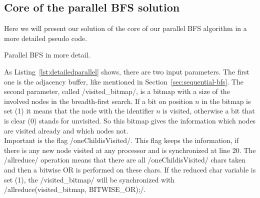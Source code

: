 \documentclass[12pt,a4paper]{article}
\begin{document}
\subsection{Core of the parallel BFS solution}
\label{sec:core}
Here we will present our solution of the core of our parallel BFS algorithm in a more detailed pseudo code.\\
\begin{listing}[h]
\begin{ccode}
/*
input: every proc has adjacency buffer of owned nodes, visited_bitmap where root is set to one
output: parent array
*/
void* BFS(adj_buffer, visited_bitmap){
	char oneChildisVisited = 1;
	while (oneChildisVisited){
	oneChildisVisited = 0;
	for (i = 0; i < size(nodes_owned); i++){
		if (nodes_owned[i] is visited for the first time) {
			for (j = 0; j < size(neighbours); j++){
				if (neighbours[j] is not visited) {
					oneChildisVisited = 1;
					set_visited_bitmap(visited_bitmap, neighbours[j]); // sets the visited bitmap on position of neighbour[j] to 1
					save_parent(parent_array, nodes_owned[i]+1,neighbours[j]); // saves that nodes_owned[i]+1 is parent of neighbours[j] in parent array
				}
			}
		}	
	}
	allreduce(oneChildisVisited, BITWISE_OR); // all procs get the information if there is a neighbour visited at all
	if (oneChildisVisited){
		allreduce(visited_bitmap, BITWISE_OR); // there has to be a reduction of all visited bitmaps to one
	}
	return parent_array;
}
\end{ccode}
\caption{Parallel BFS in more detail.}
\label{lst:detailedparallel}
\end{listing}
As Listing~\ref{lst:detailedparallel} shows, there are two input parameters. The first one is the adjacency buffer, like mentioned in Section~\ref{sec:sequential-bfs}. The second parameter, called \cinline/visited_bitmap/, is a bitmap with a size of the involved nodes in the breadth-first search. If a bit on position \(n\) in the bitmap is set (1) it means that the node with the identifier \(n\) is visited, otherwise a bit that is clear (0) stands for unvisited. So this bitmap gives the information which nodes are visited already and which nodes not.\\
Important is the flag \cinline/oneChildisVisited/. This flag keeps the information, if there is any new node visited at any processor and is synchronized at line 20. The \cinline/allreduce/ operation means that there are all \cinline/oneChildisVisited/ chars taken and then a bitwise OR is performed on these chars. If the reduced char variable is set (1), the \cinline/visited_bitmap/ will be synchronized with \cinline/allreduce(visited_bitmap, BITWISE_OR);/.
\end{document}
